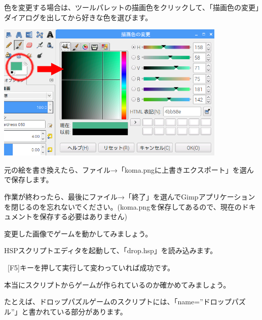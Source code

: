 \documentclass[a4paper,dvipdfmx]{jarticle}
\begin{document}
色を変更する場合は、ツールパレットの描画色をクリックして、「描画色の変更」ダイアログを出してから好きな色を選びます。


\bigskip



\begin{center}
\includegraphics[width=10.993cm,height=6.588cm]{text02-img/text02-img040.png}

\end{center}

\bigskip


\bigskip


\bigskip


\bigskip


\bigskip


\bigskip

元の絵を書き換えたら、ファイル→「koma.pngに上書きエクスポート」を選んで保存します。

作業が終わったら、最後にファイル→「終了」を選んでGimpアプリケーションを閉じるのを忘れないでください。(koma.pngを保存してあるので、現在のドキュメントを保存する必要はありません)


\bigskip

変更した画像でゲームを動かしてみましょう。

HSPスクリプトエディタを起動して、「drop.hsp」を読み込みます。

\ [F5]キーを押して実行して変わっていれば成功です。


\bigskip

本当にスクリプトからゲームが作られているのか確かめてみましょう。

たとえば、ドロップパズルゲームのスクリプトには、「name=”ドロップパズル”」と書かれている部分があります。


\bigskip
\end{document}
